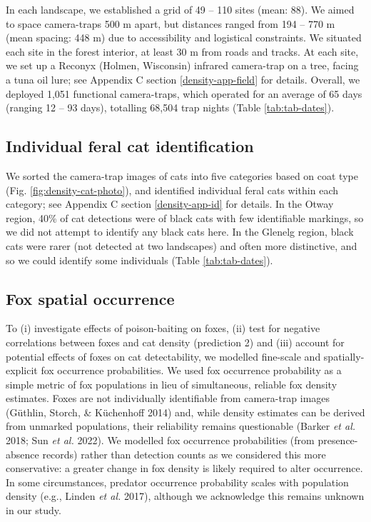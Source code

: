 \documentclass[preprint, 3p, authoryear]{elsarticle} %
\begin{document}
In each landscape, we established a grid of 49 -- 110 sites (mean: 88). We aimed to space camera-traps 500 m apart, but distances ranged from 194 -- 770 m (mean spacing: 448 m) due to accessibility and logistical constraints. We situated each site in the forest interior, at least 30 m from roads and tracks. At each site, we set up a Reconyx (Holmen, Wisconsin) infrared camera-trap on a tree, facing a tuna oil lure; see Appendix C section \ref{density-app-field} for details. Overall, we deployed 1,051 functional camera-traps, which operated for an average of 65 days (ranging 12 -- 93 days), totalling 68,504 trap nights (Table \ref{tab:tab-dates}).

\hypertarget{individual-feral-cat-identification}{%
\subsection{Individual feral cat identification}\label{individual-feral-cat-identification}}

We sorted the camera-trap images of cats into five categories based on coat type (Fig. \ref{fig:density-cat-photo}), and identified individual feral cats within each category; see Appendix C section \ref{density-app-id} for details. In the Otway region, 40\% of cat detections were of black cats with few identifiable markings, so we did not attempt to identify any black cats here. In the Glenelg region, black cats were rarer (not detected at two landscapes) and often more distinctive, and so we could identify some individuals (Table \ref{tab:tab-dates}).

\hypertarget{density-methods-fox}{%
\subsection{Fox spatial occurrence}\label{density-methods-fox}}

To (i) investigate effects of poison-baiting on foxes, (ii) test for negative correlations between foxes and cat density (prediction 2) and (iii) account for potential effects of foxes on cat detectability, we modelled fine-scale and spatially-explicit fox occurrence probabilities. We used fox occurrence probability as a simple metric of fox populations in lieu of simultaneous, reliable fox density estimates. Foxes are not individually identifiable from camera-trap images (Güthlin, Storch, \& Küchenhoff 2014) and, while density estimates can be derived from unmarked populations, their reliability remains questionable (Barker \emph{et al.} 2018; Sun \emph{et al.} 2022). We modelled fox occurrence probabilities (from presence-absence records) rather than detection counts as we considered this more conservative: a greater change in fox density is likely required to alter occurrence. In some circumstances, predator occurrence probability scales with population density (e.g., Linden \emph{et al.} 2017), although we acknowledge this remains unknown in our study.
\end{document}
